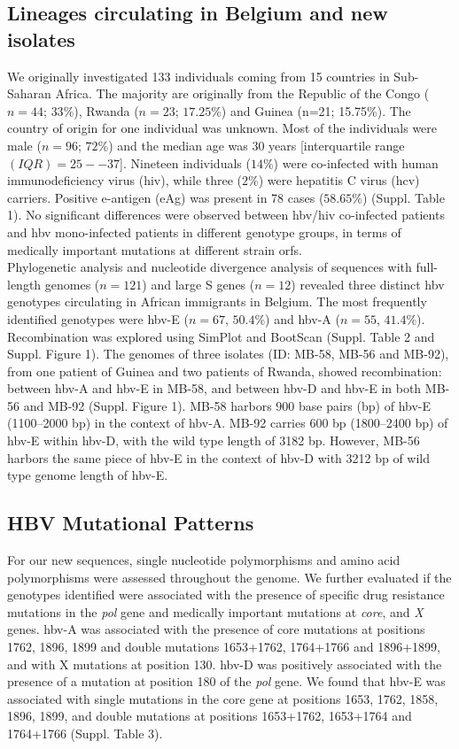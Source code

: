 \subsection{Lineages circulating in Belgium and new isolates}
We originally investigated 133 individuals coming from 15 countries in Sub-Saharan Africa.
The majority are originally from the Republic of the Congo ($n=44$; $33\%$), Rwanda ($n=23$; $17.25\%$) and Guinea (n=21; 15.75\%).
The country of origin for one individual was unknown.
Most of the individuals were male ($n=96$; $72\%$) and the median age was 30 years [interquartile range $(IQR) = 25--37$].
Nineteen individuals ($14\%$) were co-infected with human immunodeficiency virus (\gls{hiv}), while three ($2\%$) were hepatitis C virus (\gls{hcv}) carriers.
Positive e-antigen (eAg) was present in 78 cases ($58.65\%$) (Suppl. Table 1).
No significant differences were observed between \gls{hbv}/\gls{hiv} co-infected patients and \gls{hbv} mono-infected patients in different genotype groups, in terms of medically important mutations at different strain \gls{orf}s.\\

Phylogenetic analysis and nucleotide divergence analysis of sequences with full-length genomes ($n=121$) and large S genes ($n=12$) revealed three distinct \gls{hbv} genotypes circulating in African immigrants in Belgium.
The most frequently identified genotypes were \gls{hbv}-E ($n=67$, $50.4\%$) and \gls{hbv}-A ($n=55$, $41.4\%$).
Recombination was explored using SimPlot and BootScan (Suppl. Table 2 and  Suppl. Figure 1).
The genomes of three isolates (ID: MB-58, MB-56 and MB-92), from one patient of Guinea and two patients of Rwanda, showed recombination: between \gls{hbv}-A and \gls{hbv}-E in MB-58, and between \gls{hbv}-D and \gls{hbv}-E in both MB-56 and MB-92 (Suppl. Figure 1).
MB-58 harbors 900 base pairs (bp) of \gls{hbv}-E (1100--2000 bp) in the context of \gls{hbv}-A.
MB-92 carries 600 bp (1800--2400 bp) of \gls{hbv}-E within \gls{hbv}-D, with the wild type length of 3182 bp.
However, MB-56 harbors the same piece of \gls{hbv}-E in the context of \gls{hbv}-D with 3212 bp of wild type genome length of \gls{hbv}-E.

\subsection{HBV Mutational Patterns}
For our new sequences, single nucleotide polymorphisms and amino acid polymorphisms were assessed throughout the genome.
We further evaluated if the genotypes identified were associated with the presence of specific drug resistance mutations in the \textit{pol} gene and medically important mutations at \textit{core}, and \textit{X} genes.
\gls{hbv}-A was associated with the presence of core mutations at positions 1762, 1896, 1899 and double mutations 1653+1762, 1764+1766 and 1896+1899, and with X mutations at position 130.
\gls{hbv}-D was positively associated with the presence of a mutation at position 180 of the \textit{pol} gene.
We found that \gls{hbv}-E was associated with single mutations in the core gene at positions 1653, 1762, 1858, 1896, 1899, and double mutations at positions 1653+1762, 1653+1764 and 1764+1766 (Suppl. Table 3).\\

